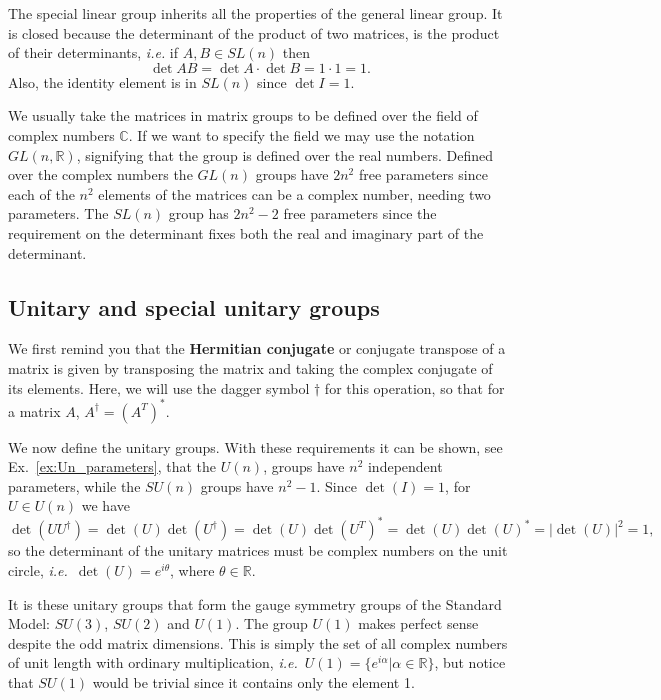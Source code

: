 \documentclass[notes.tex]{subfiles}
\begin{document}
The special linear group inherits all the properties of the general linear group. It is closed because the determinant of the product of two matrices, is the product of their determinants, {\it i.e.} if $A,B\in SL(n)$ then
\begin{equation*}
\det{AB}=\det{A}\cdot \det{B} =1 \cdot 1 = 1.
\end{equation*}
Also, the identity element is in $SL(n)$ since $\det{I}=1$.

We usually take the matrices in matrix groups to be defined over the field of complex numbers $\mathbb{C}$. If we want to specify the field we may use the notation $GL(n, \mathbb{R})$, signifying that the group is defined over the real numbers. Defined over the complex numbers the $GL(n)$ groups have $2n^2$ free parameters since each of the $n^2$ elements of the matrices can be a complex number, needing two parameters. The $SL(n)$ group has $2n^2-2$ free parameters since the requirement on the determinant fixes both the real and imaginary part of the determinant.

\subsection{Unitary and special unitary groups}
\label{sec:unitary_groups}
We first remind you that the {\bf Hermitian conjugate} or conjugate transpose of a matrix is given by transposing the matrix and taking the complex conjugate of its elements. Here, we will use the dagger symbol $\dagger$ for this operation, so that for a matrix $A$, $A^\dagger=(A^T)^*$.

We now define the unitary groups.
With these requirements it can be shown, see Ex.~\ref{ex:Un_parameters}, that the $U(n)$, groups have $n^2$ independent parameters, while the $SU(n)$ groups have $n^2-1$. Since $\det(I)=1$, for $U\in U(n)$ we have
\[\det(UU^\dagger)=\det(U)\det(U^\dagger)=\det(U)\det(U^T)^*=\det(U)\det(U)^*=|\det(U)|^2=1,\] 
so the determinant of the unitary matrices must be complex numbers on the unit circle, {\it i.e.}\ $\det(U)=e^{i\theta}$, where $\theta\in\mathbb R$.

It is these unitary groups that form the gauge symmetry groups of the Standard Model: $SU(3)$, $SU(2)$ and $U(1)$. The group $U(1)$ makes perfect sense despite the odd matrix dimensions. This is simply the set of all complex numbers of unit length with ordinary multiplication, {\it i.e.}\ $U(1)=\{e^{i\alpha} | \alpha \in\mathbb{R} \}$, but notice that $SU(1)$ would be trivial since it contains only the element 1. 
\end{document}
